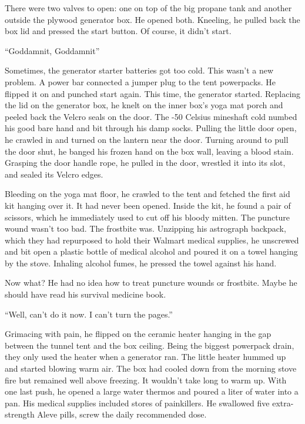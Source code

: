 There were two valves to open: one on top of the big propane tank and
another outside the plywood generator box. He opened both. Kneeling, he
pulled back the box lid and pressed the start button. Of course, it
didn't start.

``Goddamnit, Goddamnit''

Sometimes, the generator starter batteries got too cold. This wasn't a
new problem. A power bar connected a jumper plug to the tent powerpacks.
He flipped it on and punched start again. This time, the generator
started. Replacing the lid on the generator box, he knelt on the inner
box's yoga mat porch and peeled back the Velcro seals on the door. The
-50 Celsius mineshaft cold numbed his good bare hand and bit through his
damp socks. Pulling the little door open, he crawled in and turned on
the lantern near the door. Turning around to pull the door shut, he
banged his frozen hand on the box wall, leaving a blood stain. Grasping
the door handle rope, he pulled in the door, wrestled it into its slot,
and sealed its Velcro edges.

Bleeding on the yoga mat floor, he crawled to the tent and fetched the
first aid kit hanging over it. It had never been opened. Inside the kit,
he found a pair of scissors, which he immediately used to cut off his
bloody mitten. The puncture wound wasn't too bad. The frostbite was.
Unzipping his astrograph backpack, which they had repurposed to hold
their Walmart medical supplies, he unscrewed and bit open a plastic
bottle of medical alcohol and poured it on a towel hanging by the stove.
Inhaling alcohol fumes, he pressed the towel against his hand.

Now what? He had no idea how to treat puncture wounds or frostbite.
Maybe he should have read his survival medicine book.

``Well, can't do it now. I can't turn the pages.''

Grimacing with pain, he flipped on the ceramic heater hanging in the gap
between the tunnel tent and the box ceiling. Being the biggest powerpack
drain, they only used the heater when a generator ran. The little heater
hummed up and started blowing warm air. The box had cooled down from the
morning stove fire but remained well above freezing. It wouldn't take
long to warm up. With one last push, he opened a large water thermos and
poured a liter of water into a pan. His medical supplies included stores
of painkillers. He swallowed five extra-strength Aleve pills, screw the
daily recommended dose.

